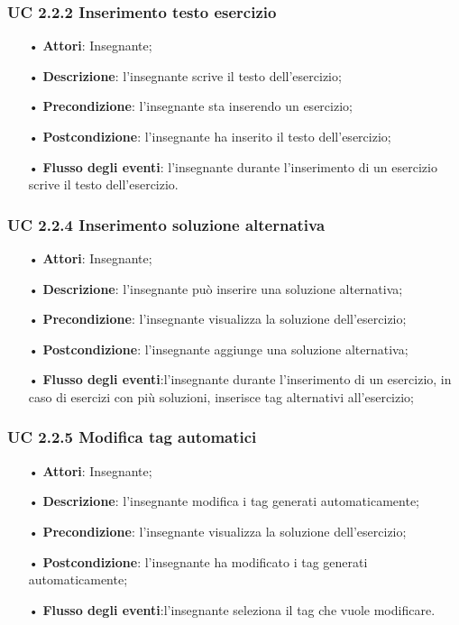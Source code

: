 \subsubsection{UC 2.2.2 Inserimento testo esercizio}
\begin{itemize}
	\item[•] \textbf{Attori}: Insegnante;
	\item[•] \textbf{Descrizione}: l'insegnante scrive il testo dell’esercizio;
	\item[•] \textbf{Precondizione}: l'insegnante sta inserendo un esercizio;
	\item[•] \textbf{Postcondizione}: l'insegnante ha inserito il testo dell'esercizio;
	\item[•] \textbf{Flusso degli eventi}: l'insegnante durante l'inserimento di un esercizio scrive il testo dell’esercizio.
\end{itemize}

\subsubsection{UC 2.2.4 Inserimento soluzione alternativa}
\begin{itemize}
	\item[•] \textbf{Attori}: Insegnante;
	\item[•] \textbf{Descrizione}: l'insegnante può inserire una soluzione alternativa;
	\item[•] \textbf{Precondizione}: l'insegnante visualizza la soluzione dell'esercizio;
	\item[•] \textbf{Postcondizione}: l'insegnante aggiunge una soluzione alternativa;
	\item[•] \textbf{Flusso degli eventi}:l'insegnante durante l'inserimento di un esercizio, in caso di esercizi con più soluzioni, inserisce tag alternativi all’esercizio;
\end{itemize}


\subsubsection{UC 2.2.5 Modifica tag automatici}
\begin{itemize}
	\item[•] \textbf{Attori}: Insegnante;
	\item[•] \textbf{Descrizione}: l’insegnante modifica i tag generati automaticamente;
	\item[•] \textbf{Precondizione}: l'insegnante visualizza la soluzione dell'esercizio;
	\item[•] \textbf{Postcondizione}: l'insegnante ha modificato i tag generati automaticamente;
	\item[•] \textbf{Flusso degli eventi}:l'insegnante seleziona il tag che vuole modificare.
\end{itemize}

